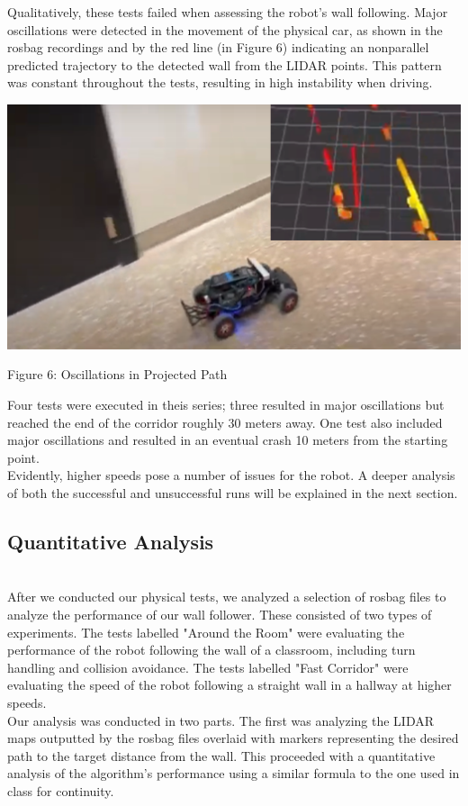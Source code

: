 \documentclass{article}
\begin{document}
Qualitatively, these tests failed when assessing the robot’s wall following. Major oscillations were detected in the movement of the physical car, as shown in the rosbag recordings and by the red line (in Figure 6) indicating an nonparallel predicted trajectory to the detected wall from the LIDAR points. This pattern was constant throughout the tests, resulting in high instability when driving. \\

\centerline{\includegraphics[width=.5\columnwidth]{pic3.png}}

\begin{center} 
    Figure 6: Oscillations in Projected Path 
\end{center}

Four tests were executed in theis series; three resulted in major oscillations but reached the end of the corridor roughly 30 meters away. One test also included major oscillations and resulted in an eventual crash 10 meters from the starting point. \\

Evidently, higher speeds pose a number of issues for the robot. A deeper analysis of both the successful and unsuccessful runs will be explained in the next section.


\subsection{Quantitative Analysis}
\author{Bill Kuhl} \\

After we conducted our physical tests, we analyzed a selection of rosbag files to analyze the performance of our wall follower. These consisted of two types of experiments. The tests labelled "Around the Room" were evaluating the performance of the robot following the wall of a classroom, including turn handling and collision avoidance. The tests labelled "Fast Corridor" were evaluating the speed of the robot following a straight wall in a hallway at higher speeds.\\

Our analysis was conducted in two parts. The first was analyzing the LIDAR maps outputted by the rosbag files overlaid with markers representing the desired path to the target distance from the wall. This proceeded with a quantitative analysis of the algorithm's performance using a similar formula to the one used in class for continuity.\\
\end{document}
